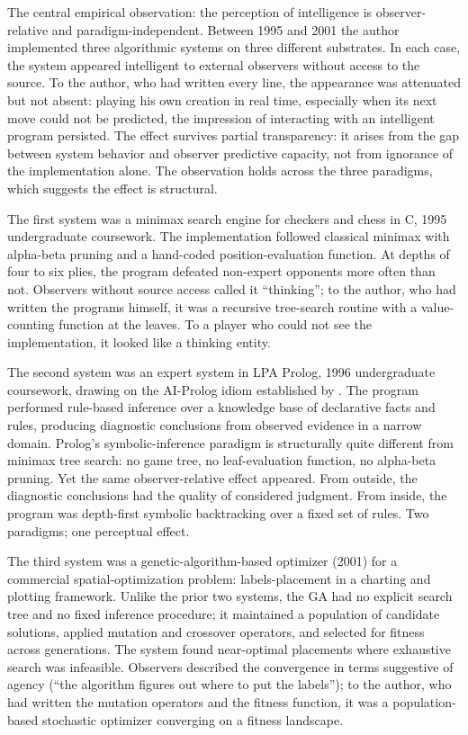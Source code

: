\documentclass[11pt]{article}
\begin{document}
The central empirical observation: the perception of intelligence is observer-relative and paradigm-independent. Between 1995 and 2001 the author implemented three algorithmic systems on three different substrates. In each case, the system appeared intelligent to external observers without access to the source. To the author, who had written every line, the appearance was attenuated but not absent: playing his own creation in real time, especially when its next move could not be predicted, the impression of interacting with an intelligent program persisted. The effect survives partial transparency: it arises from the gap between system behavior and observer predictive capacity, not from ignorance of the implementation alone. The observation holds across the three paradigms, which suggests the effect is structural.

The first system was a minimax search engine for checkers and chess in C, 1995 undergraduate coursework. The implementation followed classical minimax with alpha-beta pruning and a hand-coded position-evaluation function. At depths of four to six plies, the program defeated non-expert opponents more often than not. Observers without source access called it ``thinking''; to the author, who had written the programs himself, it was a recursive tree-search routine with a value-counting function at the leaves. To a player who could not see the implementation, it looked like a thinking entity.

The second system was an expert system in LPA Prolog, 1996 undergraduate coursework, drawing on the AI-Prolog idiom established by \citet{bratko1990}. The program performed rule-based inference over a knowledge base of declarative facts and rules, producing diagnostic conclusions from observed evidence in a narrow domain. Prolog's symbolic-inference paradigm is structurally quite different from minimax tree search: no game tree, no leaf-evaluation function, no alpha-beta pruning. Yet the same observer-relative effect appeared. From outside, the diagnostic conclusions had the quality of considered judgment. From inside, the program was depth-first symbolic backtracking over a fixed set of rules. Two paradigms; one perceptual effect.

The third system was a genetic-algorithm-based optimizer (2001) for a commercial spatial-optimization problem: labels-placement in a charting and plotting framework. Unlike the prior two systems, the GA had no explicit search tree and no fixed inference procedure; it maintained a population of candidate solutions, applied mutation and crossover operators, and selected for fitness across generations. The system found near-optimal placements where exhaustive search was infeasible. Observers described the convergence in terms suggestive of agency (``the algorithm figures out where to put the labels''); to the author, who had written the mutation operators and the fitness function, it was a population-based stochastic optimizer converging on a fitness landscape.
\end{document}
